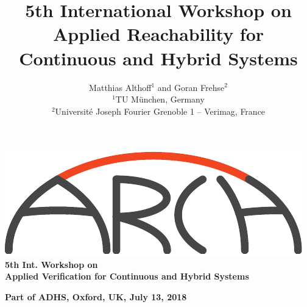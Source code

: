 \documentclass[a4paper,10pt]{article}
\title{5th International Workshop on Applied Reachability for Continuous and Hybrid Systems}
\author{Matthias Althoff$^1$ and Goran Frehse$^2$ \\
$^1$TU M\"unchen, Germany \\
$^2$Université Joseph Fourier Grenoble 1 -- Verimag, France
}
\begin{document}

\thispagestyle{empty}
\begin{center}
        \includegraphics[width=0.2\columnwidth]{ARCH_logo_1_bold.pdf} \\
	\textbf{\LARGE{5th Int. Workshop on \\ Applied Verification for Continuous and Hybrid Systems}}
	
	\smallskip \smallskip
	
	\textbf{\Large{Part of ADHS, Oxford, UK, July 13, 2018}}
	

	
	
\end{center}

\bigskip

%

%
\end{document}
